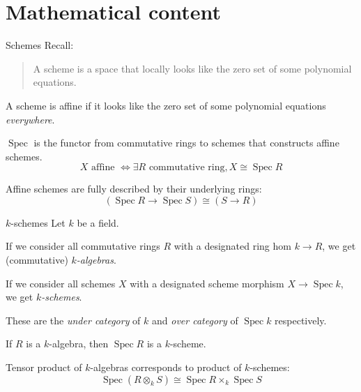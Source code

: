 \documentclass[10pt, handout]{beamer}
\DeclareMathOperator{\Spec}{Spec}
\begin{document}
\section{Mathematical content}


\begin{frame}{Schemes}
    Recall:

    \begin{quote}
         A scheme is a space that locally looks like the zero set of some polynomial equations.
    \end{quote}

    A scheme is \alert{affine} if it looks like the zero set of some polynomial equations \emph{everywhere}.

    \pause

    \alert{$\Spec$} is the functor from commutative rings to schemes that constructs affine schemes.
    \[
        X \text{ affine } \iff \exists R \text{ commutative ring}, X \cong \Spec R
    \]

    Affine schemes are fully described by their underlying rings:
    \[
        (\Spec R \to \Spec S) \cong (S \to R)
    \]
\end{frame}


\begin{frame}{$k$-schemes}
    Let $k$ be a field.

    If we consider all commutative rings $R$ with a designated ring hom $k \to R$, we get (commutative) \emph{$k$-algebras}.

    If we consider all schemes $X$ with a designated scheme morphism $X \to \Spec k$, we get \emph{$k$-schemes}.

    \pause

    These are the \emph{under category} of $k$ and \emph{over category} of $\Spec k$ respectively.

    \pause

    If $R$ is a $k$-algebra, then $\Spec R$ is a $k$-scheme.

    Tensor product of $k$-algebras corresponds to product of $k$-schemes:
    \[
        \Spec (R \otimes_k S) \cong \Spec R \times_k \Spec S
    \]
\end{frame}
\end{document}
